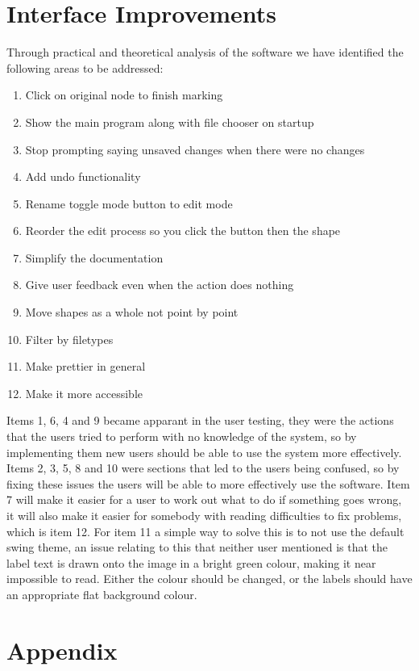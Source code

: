 \documentclass[a4paper,11pt,oneside]{article}
\begin{document}
\section{Interface Improvements}
Through practical and theoretical analysis of the software we have identified the following areas to be addressed:
\begin{enumerate}
    \item{Click on original node to finish marking}
    \item{Show the main program along with file chooser on startup}
    \item{Stop prompting saying unsaved changes when there were no changes}
    \item{Add undo functionality}
    \item{Rename toggle mode button to edit mode}
    \item{Reorder the edit process so you click the button then the shape}
    \item{Simplify the documentation}
    \item{Give user feedback even when the action does nothing}
    \item{Move shapes as a whole not point by point}
    \item{Filter by filetypes}
    \item{Make prettier in general}
    \item{Make it more accessible}
\end{enumerate}

Items 1, 6, 4 and 9 became apparant in the user testing, they were the actions that the users tried to perform with no knowledge of the system, so by implementing them new users should be able to use the system more effectively.  Items 2, 3, 5, 8 and 10 were sections that led to the users being confused, so by fixing these issues the users will be able to more effectively use the software.  Item 7 will make it easier for a user to work out what to do if something goes wrong, it will also make it easier for somebody with reading difficulties to fix problems, which is item 12.  For item 11 a simple way to solve this is to not use the default swing theme, an issue relating to this that neither user mentioned is that the label text is drawn onto the image in a bright green colour, making it near impossible to read.  Either the colour should be changed, or the labels should have an appropriate flat background colour.

\newpage
\section{Appendix}
\appendix
\end{document}
